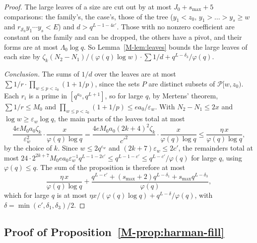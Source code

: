 \documentclass[11pt]{article}
\numberwithin{equation}{section}
\begin{document}
\begin{proof}
The large leaves of a size are cut out by at most $J_0 + s_{\max} + 5$ comparisons: the family's, the case's, those of
the tree ($y_1 < z_0$, $y_1 > \dots > y_s \ge w$ and $r_{\mathcal S_0} y_1 \cdots y_s < E$) and
$d > q^{L - 1 - 4c'}$. Those with no nonzero coefficient are
constant on the family and can be dropped, the others have a pivot, and their forms are at most $\Lambda_0 \log q$. So
Lemma~\ref{M-lem:leaves} bounds the large leaves of each size by $\zeta_k (N_2 - N_1)/(\varphi(q) \log w) \cdot \sum 1/d
+ q^{L - \delta_3}/\varphi(q)$.

\emph{Conclusion.} The sums of $1/d$ over the leaves are at most $\sum 1/r \cdot \prod_{w \le p < z_0}(1 + 1/p)$, since
the sets $P$ are distinct subsets of $\mathcal P[w, z_0)$. Each $r_i$ is a prime in $[q^{a_0}, q^{L + 1}]$, so for large
$q$, by Mertens' theorem, $\sum 1/r \le M_0$ and $\prod_{w \le p < z_0}(1 +
1/p) \le e a_0/\varepsilon_w$. With $N_2 - N_1 \le 2x$ and $\log w \ge \varepsilon_w \log q$, the main parts of the
leaves total at most
\[
  \frac{4 e M_0 a_0 \zeta_k}{\varepsilon_w^2} \cdot \frac{x}{\varphi(q) \log q}
  = \frac{4 e M_0 a_0 (2k + 4)^2 \zeta_k}{c'^2} \cdot \frac{x}{\varphi(q) \log q}
  \le \frac{\eta \, x}{\varphi(q) \log q},
\]
by the choice of $k$. Since $w \le 2q^{\varepsilon_w}$ and $(2k + 7)\varepsilon_w \le 2c'$, the remainders total at most
$24 \cdot 2^{2k + 7} M_0 e a_0 \varepsilon_w^{-1} q^{L - 1 - 2c'} \le q^{L - 1 - c'} \le q^{L - c'}/\varphi(q)$ for
large $q$, using $\varphi(q) \le q$. The sum of the proposition is therefore at most
\[
  \frac{\eta \, x}{\varphi(q) \log q} + \frac{q^{L - c'} + (s_{\max} + 2) q^{L - \delta_1} + s_{\max} q^{L -
  \delta_3}}{\varphi(q)},
\]
which for large $q$ is at most $\eta x/(\varphi(q) \log q) + q^{L - \delta}/\varphi(q)$, with $\delta = \min(c',
\delta_1, \delta_3)/2$.
\end{proof}

\subsection*{Proof of Proposition~\ref{M-prop:harman-fill}}
\end{document}
